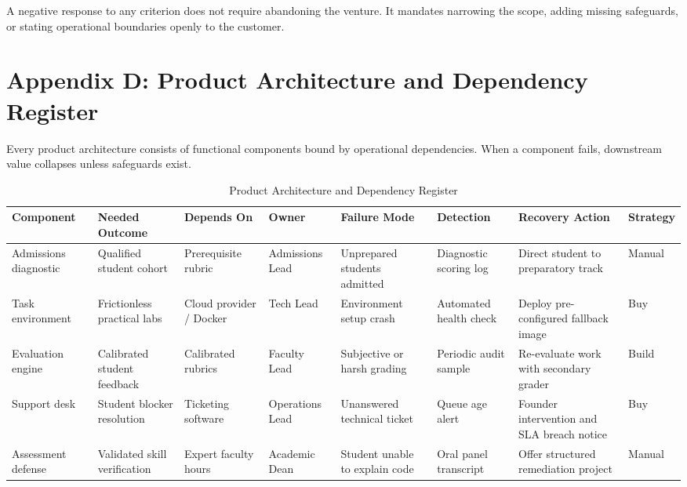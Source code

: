 A negative response to any criterion does not require abandoning the venture. It mandates narrowing the scope, adding missing safeguards, or stating operational boundaries openly to the customer.

\section*{Appendix D: Product Architecture and Dependency Register}

Every product architecture consists of functional components bound by operational dependencies. When a component fails, downstream value collapses unless safeguards exist.

\begin{table}[t]
\centering
\footnotesize
\setlength{\tabcolsep}{3pt}
\caption{Product Architecture and Dependency Register}
\label{tab:architecture_dependency_register}
\begin{tabularx}{\textwidth}{>{\raggedright\arraybackslash}p{} >{\raggedright\arraybackslash}p{} >{\raggedright\arraybackslash}p{} >{\raggedright\arraybackslash}p{} >{\raggedright\arraybackslash}p{} >{\raggedright\arraybackslash}p{} >{\raggedright\arraybackslash}X >{\centering\arraybackslash}p{}}
\toprule
Component & Needed Outcome & Depends On & Owner & Failure Mode & Detection & Recovery Action & Strategy \\
\midrule
Admissions diagnostic & Qualified student cohort & Prerequisite rubric & Admissions Lead & Unprepared students admitted & Diagnostic scoring log & Direct student to preparatory track & Manual \\
Task environment & Frictionless practical labs & Cloud provider / Docker & Tech Lead & Environment setup crash & Automated health check & Deploy pre-configured fallback image & Buy \\
Evaluation engine & Calibrated student feedback & Calibrated rubrics & Faculty Lead & Subjective or harsh grading & Periodic audit sample & Re-evaluate work with secondary grader & Build \\
Support desk & Student blocker resolution & Ticketing software & Operations Lead & Unanswered technical ticket & Queue age alert & Founder intervention and SLA breach notice & Buy \\
Assessment defense & Validated skill verification & Expert faculty hours & Academic Dean & Student unable to explain code & Oral panel transcript & Offer structured remediation project & Manual \\
\bottomrule
\end{tabularx}
\end{table}
